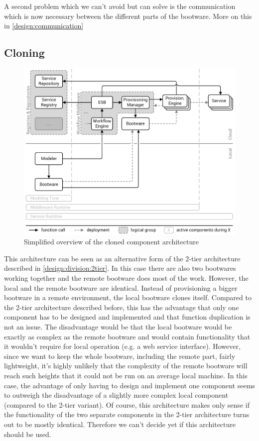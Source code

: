 A second problem which we can't avoid but can solve is the communication which is now necessary between the different parts of the bootware.
More on this in \autoref{design:communication}

\subsection{Cloning}

\begin{figure}[!htbp]
	\centering
	\includegraphics[resolution=600]{design/assets/clone}
	\caption{Simplified overview of the cloned component architecture}
	\label{image:clone}
\end{figure}

This architecture can be seen as an alternative form of the 2-tier architecture described in \autoref{design:division:2tier}.
In this case there are also two bootwares working together and the remote bootware does most of the work.
However, the local and the remote bootware are identical.
Instead of provisioning a bigger bootware in a remote environment, the local bootware clones itself.
Compared to the 2-tier architecture described before, this has the advantage that only one component has to be designed and implemented and that function duplication is not an issue.
The disadvantage would be that the local bootware would be exactly as complex as the remote bootware and would contain functionality that it wouldn't require for local operation (e.g. a web service interface).
However, since we want to keep the whole bootware, including the remote part, fairly lightweight, it's highly unlikely that the complexity of the remote bootware will reach such heights that it could not be run on an average local machine.
In this case, the advantage of only having to design and implement one component seems to outweigh the disadvantage of a slightly more complex local component (compared to the 2-tier variant).
Of course, this architecture makes only sense if the functionality of the two separate components in the 2-tier architecture turns out to be mostly identical.
Therefore we can't decide yet if this architecture should be used.

